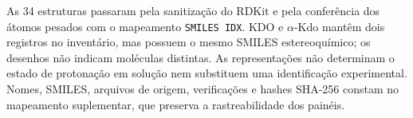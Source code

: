 As 34 estruturas passaram pela sanitização do RDKit e pela conferência dos átomos pesados com o mapeamento \texttt{SMILES IDX}. KDO e \(\alpha\)-Kdo mantêm dois registros no inventário, mas possuem o mesmo SMILES estereoquímico; os desenhos não indicam moléculas distintas. As representações não determinam o estado de protonação em solução nem substituem uma identificação experimental. Nomes, SMILES, arquivos de origem, verificações e hashes SHA-256 constam no mapeamento suplementar, que preserva a rastreabilidade dos painéis.
